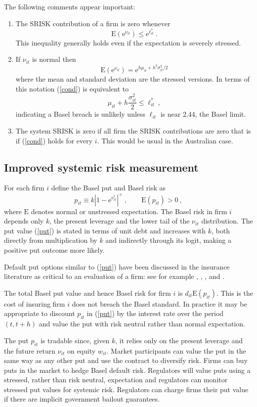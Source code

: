 \documentclass[authoryear]{elsarticle}
\newcommand{\E}{\mathrm{E}}
\newcommand{\e}{\mathrm{e}}
\newcommand{\eref}[1]{(\ref{#1})}
\newcommand{\cq}{\ , \qquad}
\newcommand{\be}[1]{\begin{equation}\label{#1}}
\newcommand{\ee}{\end{equation}}
\begin{document}
The following comments appear important:
\begin{enumerate}
\item The SRISK contribution of a firm is zero whenever
\be{cond}
\E(\e^{\nu_{it}})\le\e^{\ell^*_{it}}\ .
\ee
This inequality generally holds even if the expectation is severely stressed. 
\item  If $\nu_{it}$ is normal then 
$$
\E(\e^{\nu_{it}}) = \e^{h\mu_{it} +h^2\sigma^2_{it}/2}
$$
where the mean and standard deviation are the stressed versions.  In terms of this notation \eref{cond}
is equivalent to
$$
\mu_{it} +h\frac{\sigma^2_{it}}{2}\le \ell_{it}^* \ ,
$$
indicating a Basel breach is unlikely unless $\ell_{it}$ is near 2.44, the Basel limit.

\item The system SRISK is zero if all firm the SRISK contributions are zero that is if \eref{cond} holds for every $i$.  This would be usual in the Australian case.
\end{enumerate}

\subsection{Improved systemic risk measurement}

For each firm $i$ define the  Basel put and  Basel risk as 
\be{put}
p_{it}\equiv k |1-\e^{\nu^*_{it}}|^+\cq \E(p_{it})>0\ ,
\ee
where $\E$ denotes normal or unstressed expectation.  The Basel risk in firm $i$ depends only $k$,  the present leverage  and the lower tail of the  $\nu_{it}$ distribution.  The put value \eref{put} is stated in terms of unit debt and increases with $k$, both directly from  multiplication by $k$ and indirectly through its logit, making a positive put outcome more likely.  

Default put options similar to \eref{put} have been discussed in the insurance literature as critical to an evaluation of a firm:  see for
example \citet{merton1977analytic}, \citet{doherty1986price}, \citet{cummins1988risk}, \citet{myers2001capital} and \citet{sherris2006solvency}.

The total Basel put value and hence Basel risk for firm  $i$ is   $d_{it}\E(p_{it})$.   This is the cost of insuring firm $i$ does not breach the Basel standard.  In practice it may be appropriate to discount $p_{it}$ in \eref{put} by the interest rate over the period $(t,t+h)$ and value the put with risk neutral rather than normal expectation.       

The put $p_{it}$ is tradable since, given $k$, it relies only on the present leverage and the future return $\nu_{it}$ on equity $w_{it}$.  Market participants can value the put in  the same way as any other put and use the contract to diversify risk.  Firms can buy puts in the market to hedge Basel default risk.    Regulators will value puts using a stressed, rather than risk neutral, expectation and regulators can monitor stressed put values for systemic risk. Regulators can charge firms their put value if there are implicit government bailout guarantees.
\end{document}
